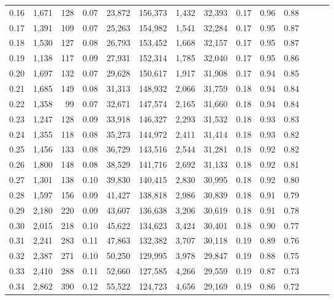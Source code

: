 \begin{tabular}{rrrrrrrrrrrrrr}
0.16 &  1,671 &  128 &  0.07 &   23,872 &  156,373 &   1,432 &  32,393 &  0.17 &  0.96 &      0.88 \\
0.17 &  1,391 &  109 &  0.07 &   25,263 &  154,982 &   1,541 &  32,284 &  0.17 &  0.95 &      0.87 \\
0.18 &  1,530 &  127 &  0.08 &   26,793 &  153,452 &   1,668 &  32,157 &  0.17 &  0.95 &      0.87 \\
0.19 &  1,138 &  117 &  0.09 &   27,931 &  152,314 &   1,785 &  32,040 &  0.17 &  0.95 &      0.86 \\
0.20 &  1,697 &  132 &  0.07 &   29,628 &  150,617 &   1,917 &  31,908 &  0.17 &  0.94 &      0.85 \\
0.21 &  1,685 &  149 &  0.08 &   31,313 &  148,932 &   2,066 &  31,759 &  0.18 &  0.94 &      0.84 \\
0.22 &  1,358 &   99 &  0.07 &   32,671 &  147,574 &   2,165 &  31,660 &  0.18 &  0.94 &      0.84 \\
0.23 &  1,247 &  128 &  0.09 &   33,918 &  146,327 &   2,293 &  31,532 &  0.18 &  0.93 &      0.83 \\
0.24 &  1,355 &  118 &  0.08 &   35,273 &  144,972 &   2,411 &  31,414 &  0.18 &  0.93 &      0.82 \\
0.25 &  1,456 &  133 &  0.08 &   36,729 &  143,516 &   2,544 &  31,281 &  0.18 &  0.92 &      0.82 \\
0.26 &  1,800 &  148 &  0.08 &   38,529 &  141,716 &   2,692 &  31,133 &  0.18 &  0.92 &      0.81 \\
0.27 &  1,301 &  138 &  0.10 &   39,830 &  140,415 &   2,830 &  30,995 &  0.18 &  0.92 &      0.80 \\
0.28 &  1,597 &  156 &  0.09 &   41,427 &  138,818 &   2,986 &  30,839 &  0.18 &  0.91 &      0.79 \\
0.29 &  2,180 &  220 &  0.09 &   43,607 &  136,638 &   3,206 &  30,619 &  0.18 &  0.91 &      0.78 \\
0.30 &  2,015 &  218 &  0.10 &   45,622 &  134,623 &   3,424 &  30,401 &  0.18 &  0.90 &      0.77 \\
0.31 &  2,241 &  283 &  0.11 &   47,863 &  132,382 &   3,707 &  30,118 &  0.19 &  0.89 &      0.76 \\
0.32 &  2,387 &  271 &  0.10 &   50,250 &  129,995 &   3,978 &  29,847 &  0.19 &  0.88 &      0.75 \\
0.33 &  2,410 &  288 &  0.11 &   52,660 &  127,585 &   4,266 &  29,559 &  0.19 &  0.87 &      0.73 \\
0.34 &  2,862 &  390 &  0.12 &   55,522 &  124,723 &   4,656 &  29,169 &  0.19 &  0.86 &      0.72 \\

\end{tabular}

